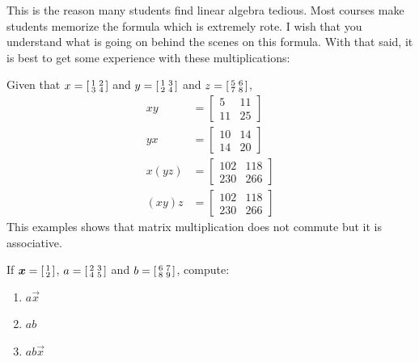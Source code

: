 This is the reason many students find linear algebra tedious. Most courses make students memorize the formula which is extremely rote. I wish that you understand what is going on behind the scenes on this formula. With that said, it is best to get some experience with these multiplications:

\begin{example}
  Given that \(x=\begin{bsmallmatrix}
    1 & 2 \\
    3 & 4
  \end{bsmallmatrix} \) and \(y=\begin{bsmallmatrix}
    1 & 3 \\
    2 & 4
  \end{bsmallmatrix} \) and \(z=\begin{bsmallmatrix}
    5 & 6 \\
    7 & 8 
  \end{bsmallmatrix} \), 
  \begin{align*}
    xy&=\begin{bmatrix}
      5 & 11 \\
      11 & 25
    \end{bmatrix} \\
    yx&=\begin{bmatrix}
      10 & 14 \\
      14 & 20
    \end{bmatrix} \\
    x(yz)&=\begin{bmatrix}
      102 & 118 \\
      230 & 266
    \end{bmatrix} \\
    (xy)z&=\begin{bmatrix}
      102 & 118 \\
      230 & 266
    \end{bmatrix}
  \end{align*}
  This examples shows that matrix multiplication does not commute but it is associative.
\end{example}
\begin{problem}
  If \(\vec{x}=\begin{bsmallmatrix}
    1 \\
    2
  \end{bsmallmatrix} \), \(a=\begin{bsmallmatrix}
    2 & 3 \\
    4 & 5
  \end{bsmallmatrix} \) and \(b=\begin{bsmallmatrix}
    6 & 7 \\
    8 & 9
  \end{bsmallmatrix} \), compute: \begin{enumerate}[label=\alph*)]
    \item{\(a\vec{x}\)}
    \item{\(ab\)}
    \item{\(ab\vec{x}\)}
  \end{enumerate} 
\end{problem}
